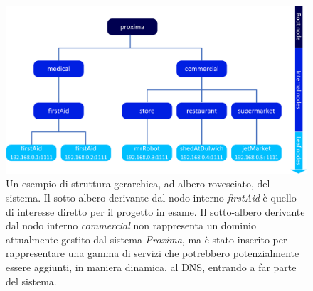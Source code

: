 \documentclass[a4paper,12pt]{report}
\begin{document}
\begin{figure}[H]
	\centering
	\includegraphics[scale=0.7]{./img/dns-hierarchy.png}
	\caption{Un esempio di struttura gerarchica, ad albero rovesciato, del sistema. Il sotto-albero derivante dal nodo interno \emph{firstAid} è quello di interesse diretto per il progetto in esame. Il sotto-albero derivante dal nodo interno \emph{commercial} non rappresenta un dominio attualmente gestito dal sistema \emph{Proxima}, ma è stato inserito per rappresentare una gamma di servizi che potrebbero potenzialmente essere aggiunti, in maniera dinamica, al DNS, entrando a far parte del sistema. }
	\label{fig:dns-hierarchy}
\end{figure}
\end{document}
